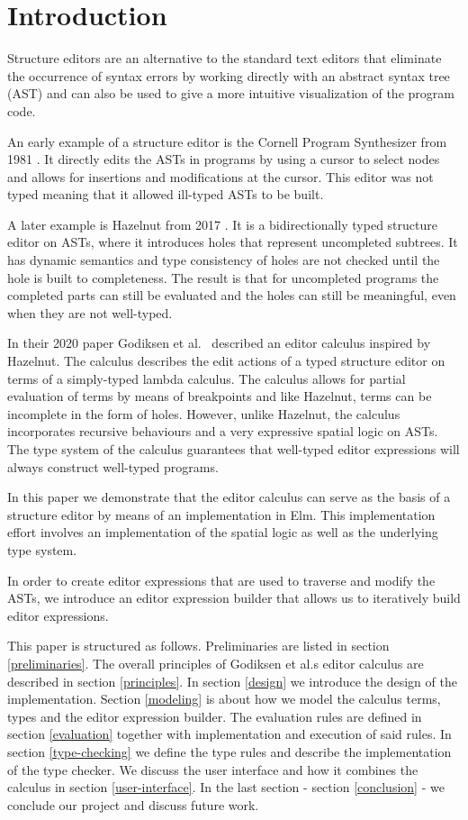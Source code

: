 \section{Introduction}
\label{introduction}

Structure editors are an alternative to the standard text editors that
eliminate the occurrence of syntax errors by working directly with an
abstract syntax tree (AST) and can also be used to give a more intuitive
visualization of the program code.

An early example of a structure editor is the Cornell Program Synthesizer
from 1981 \cornell. It directly edits the ASTs in programs by using a cursor to
select nodes and allows for insertions and modifications at the cursor. This
editor was not typed meaning that it allowed ill-typed ASTs to be built.

A later example is Hazelnut from 2017 \hazel. It is a bidirectionally typed
structure editor on ASTs, where it introduces holes that represent uncompleted
subtrees. It has dynamic semantics and type consistency of holes are not
checked until the hole is built to completeness. The result is that for
uncompleted programs the completed parts can still be evaluated and the holes
can still be meaningful, even when they are not well-typed.

In their 2020 paper Godiksen et al. \pepm~described an editor calculus
inspired by Hazelnut. The calculus describes the edit actions of a 
typed structure editor on terms of a simply-typed lambda
calculus. The calculus allows for partial evaluation of terms by means
of breakpoints and like Hazelnut, terms can be incomplete in the form
of holes. However, unlike Hazelnut, the calculus incorporates recursive
behaviours and a very expressive spatial logic on ASTs. The type
system of the calculus guarantees that well-typed editor expressions
will always construct well-typed programs.

In this paper we demonstrate that the editor calculus can serve as the
basis of a structure editor by means of an implementation in
Elm. This implementation effort involves an implementation of the
spatial logic as well as the underlying type system.

In order to create editor expressions that are used to traverse and modify the
ASTs, we introduce an editor expression builder that allows us to
iteratively build editor expressions.

This paper is structured as follows. Preliminaries are listed in section
\ref{preliminaries}. The overall principles of Godiksen et al.s editor calculus
are described in section \ref{principles}. In section \ref{design} we introduce
the design of the implementation. Section \ref{modeling} is about how we model
the calculus terms, types and the editor expression builder. The evaluation
rules are defined in section \ref{evaluation} together with implementation and
execution of said rules. In section \ref{type-checking} we define the type
rules and describe the implementation of the type checker. We discuss the user
interface and how it combines the calculus in section \ref{user-interface}. In
the last section - section \ref{conclusion} - we conclude our project and
discuss future work.


